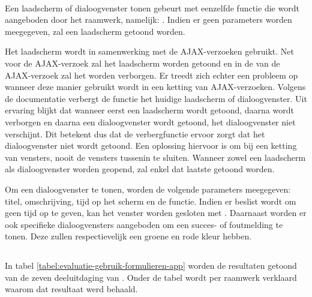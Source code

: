 \paragraph{\lungo}
Een laadscherm of dialoogvenster tonen gebeurt met eenzelfde functie die wordt aangeboden door het raamwerk, namelijk: .
Indien er geen parameters worden meegegeven, zal een laadscherm getoond worden.

Het laadscherm wordt in samenwerking met de AJAX-verzoeken gebruikt.
Net voor de AJAX-verzoek zal het laadscherm worden getoond en in de  van de AJAX-verzoek zal het worden verborgen.
Er treedt zich echter een probleem op wanneer deze manier gebruikt wordt in een ketting van AJAX-verzoeken.
Volgens de documentatie verbergt de functie  het huidige laadscherm of dialoogvenster. 
Uit ervaring blijkt dat wanneer eerst een laadscherm wordt getoond, daarna wordt verborgen en daarna een dialoogvenster wordt getoond, het dialoogvenster niet verschijnt.
Dit betekent dus dat de verbergfunctie ervoor zorgt dat het dialoogvenster niet wordt getoond.
Een oplossing hiervoor is om bij een ketting van vensters, nooit de vensters tussenin te sluiten.
Wanneer zowel een laadscherm als dialoogvenster worden geopend, zal enkel dat laatste getoond worden.

Om een dialoogvenster te tonen, worden de volgende parameters meegegeven: titel, omschrijving, tijd op het scherm en de  functie.
Indien er beslist wordt om geen tijd op te geven, kan het venster worden gesloten met .
Daarnaast worden er ook specifieke dialoogvensters aangeboden om een succes- of foutmelding te tonen.
Deze zullen respectievelijk een groene en rode kleur hebben.



\subsection{}
\label{sec:evaluatie-gebruik-formulieren-app}

In tabel \ref{tabel:evaluatie-gebruik-formulieren-app} worden de resultaten getoond van de zeven deeluitdaging van .
Onder de tabel wordt per raamwerk verklaard waarom dat resultaat werd behaald.

